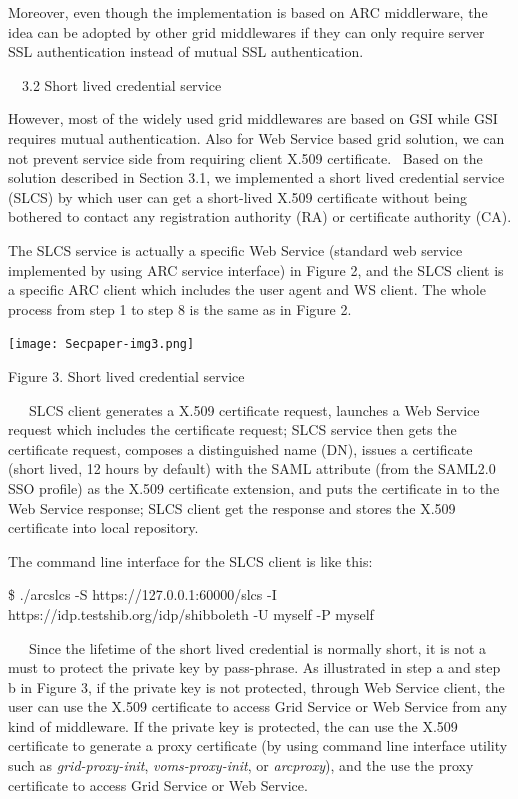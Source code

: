 \documentclass{article}
\begin{document}
Moreover, even though the implementation is based on ARC middlerware,
the idea can be adopted by other grid middlewares if they can only
require server SSL authentication instead of mutual SSL authentication.


\bigskip

\ \ 3.2 Short lived credential service

However, most of the widely used grid middlewares are based on GSI while
GSI requires mutual authentication. Also for Web Service based grid
solution, we can not prevent service side from requiring client X.509
certificate. \ Based on the solution described in Section 3.1, we
implemented a short lived credential service (SLCS) by which user can
get a short-lived X.509 certificate without being bothered to contact
any registration authority (RA) or certificate authority (CA).

The SLCS service is actually a specific Web Service (standard web
service implemented by using ARC service interface) in Figure 2, and
the SLCS client is a specific ARC client which includes the user agent
and WS client. The whole process from step 1 to step 8 is the same as
in Figure 2.


\bigskip



\begin{center}
\texttt{[image: Secpaper-img3.png]}
\end{center}
{\centering
Figure 3. Short lived credential service
\par}

\ \ \ SLCS client generates a X.509 certificate request, launches a Web
Service request which includes the certificate request; SLCS service
then gets the certificate request, composes a distinguished name (DN),
issues a certificate (short lived, 12 hours by default) with the SAML
attribute (from the SAML2.0 SSO profile) as the X.509 certificate
extension, and puts the certificate in to the Web Service response;
SLCS client get the response and stores the X.509 certificate into
local repository.

The command line interface for the SLCS client is like this:

\$ ./arcslcs -S https://127.0.0.1:60000/slcs -I
https://idp.testshib.org/idp/shibboleth -U myself -P myself

\ \ \ Since the lifetime of the short lived credential is normally
short, it is not a must to protect the private key by pass-phrase. As
illustrated in step a and step b in Figure 3, if the private key is not
protected, through Web Service client, the user can use the X.509
certificate to access Grid Service or Web Service from any kind of
middleware. If the private key is protected, the can use the X.509
certificate to generate a proxy certificate (by using command line
interface utility such as \textit{grid-proxy-init},
\textit{voms-proxy-init}, or \textit{arcproxy}), and the use the proxy
certificate to access Grid Service or Web Service. 
\end{document}
